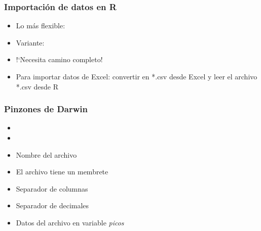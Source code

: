 \documentclass[mathserif]{beamer}
\begin{document}
%
%







\begin{frame}[plain,label=d19]%
\frametitle{Importaci\'on de datos en R}
\begin{itemize}
   \item Lo m\'as flexible: 
   \item Variante: 
   \item !`Necesita camino completo!
   \item Para importar datos de Excel: convertir en *.csv desde Excel y leer el archivo *.csv desde R
\end{itemize}
\end{frame}%

\begin{frame}[plain,label=d20]%
\frametitle{Pinzones de Darwin}
\begin{itemize}
   \item {}
   \item {}
   \item Nombre del archivo
   \item El archivo tiene un membrete
   \item Separador de columnas
   \item Separador de decimales
   \item Datos del archivo en variable \emph{picos}
\end{itemize}
\end{frame}%
\end{document}
